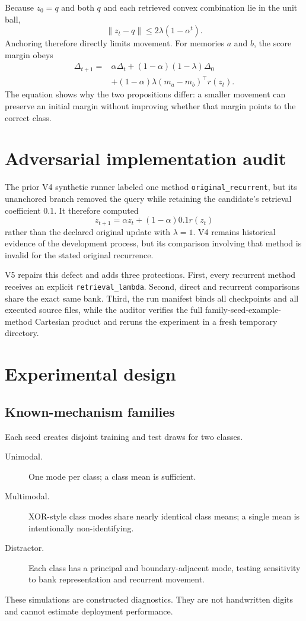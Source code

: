 \documentclass[11pt]{article}
\begin{document}
Because $z_0=q$ and both $q$ and each retrieved convex combination lie in the unit ball,
\begin{equation}
  \|z_t-q\|\leq 2\lambda(1-\alpha^t). \label{eq:displacement}
\end{equation}
Anchoring therefore directly limits movement. For memories $a$ and $b$, the score margin obeys
\begin{align}
\Delta_{t+1}={}&\alpha\Delta_t+(1-\alpha)(1-\lambda)\Delta_0\\
&+(1-\alpha)\lambda(m_a-m_b)^\top r(z_t).
\end{align}
The equation shows why the two propositions differ: a smaller movement can preserve an initial margin without improving whether that margin points to the correct class.

\section{Adversarial implementation audit}
The prior V4 synthetic runner labeled one method \texttt{original\_recurrent}, but its unanchored branch removed the query while retaining the candidate's retrieval coefficient $0.1$. It therefore computed
\[
z_{t+1}=\alpha z_t+(1-\alpha)0.1r(z_t)
\]
rather than the declared original update with $\lambda=1$. V4 remains historical evidence of the development process, but its comparison involving that method is invalid for the stated original recurrence.

V5 repairs this defect and adds three protections. First, every recurrent method receives an explicit \texttt{retrieval\_lambda}. Second, direct and recurrent comparisons share the exact same bank. Third, the run manifest binds all checkpoints and all executed source files, while the auditor verifies the full family-seed-example-method Cartesian product and reruns the experiment in a fresh temporary directory.

\section{Experimental design}
\subsection{Known-mechanism families}
Each seed creates disjoint training and test draws for two classes.
\begin{description}
  \item[Unimodal.] One mode per class; a class mean is sufficient.
  \item[Multimodal.] XOR-style class modes share nearly identical class means; a single mean is intentionally non-identifying.
  \item[Distractor.] Each class has a principal and boundary-adjacent mode, testing sensitivity to bank representation and recurrent movement.
\end{description}
These simulations are constructed diagnostics. They are not handwritten digits and cannot estimate deployment performance.
\end{document}
